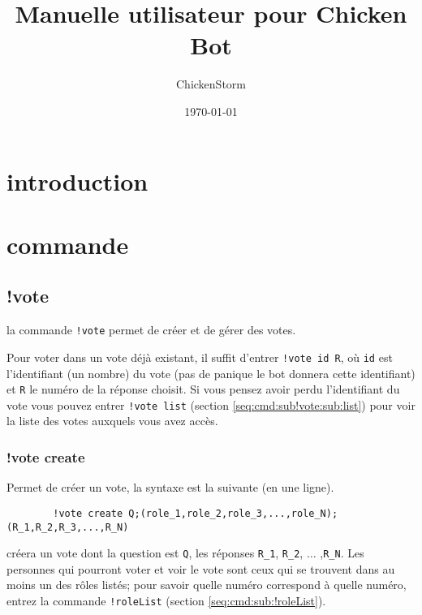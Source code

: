 \documentclass[a4paper,12pt,twoside]{article}
\newcommand{\ig}[1]{}
\begin{document}
	

		\baselineskip=16pt
		\parindent=15pt
		\parskip=5pt
		
		\title{Manuelle utilisateur pour Chicken Bot}
		\date{\today}
		\author{ChickenStorm}
		\maketitle
		
	
		\section{introduction}
		
		\section{commande}
		
		\subsection{!vote}
		la commande \verb|!vote| permet de créer et de gérer des votes.
		
		Pour voter dans un vote déjà existant, il suffit d'entrer \verb|!vote id R|, où \verb|id| est l'identifiant (un nombre) du vote (pas de panique le bot donnera cette identifiant) et \verb|R| le numéro de la réponse choisit. Si vous pensez avoir perdu l'identifiant du vote vous pouvez entrer  \verb|!vote list| (section \ref{seq:cmd:sub!vote:sub:list}) pour voir la liste des votes auxquels vous avez accès.
		
		\ig{
			\subsubsection{!vote help}
			cette commande permet d'afficher l'aide pour la commande vote
		}
		\subsubsection{!vote create}\label{seq:cmd:sub!vote:sub:create}
		
		Permet de créer un vote, la syntaxe est la suivante (en une ligne).
		\begin{lstlisting}
		!vote create Q;(role_1,role_2,role_3,...,role_N); (R_1,R_2,R_3,...,R_N) 
		\end{lstlisting}
		
		créera un vote dont la question est \verb|Q|, les réponses \verb|R_1|, \verb|R_2|, $\dots$ ,\verb|R_N|. Les personnes qui pourront voter et voir le vote sont ceux qui se trouvent dans au moins un des rôles listés; pour savoir quelle numéro correspond à quelle numéro, entrez la commande \verb|!roleList| (section \ref{seq:cmd:sub:!roleList}).
		
\end{document}

